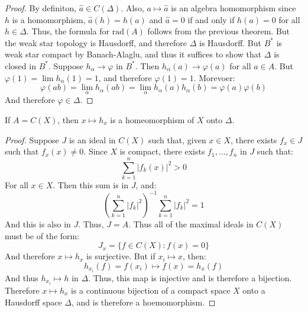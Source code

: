         \begin{proof}
            By definiton, $\hat{a}\in{C}(\Delta)$. Also,
            $a\mapsto\hat{a}$ is an algebra homomorphism since
            $h$ is a homomorphism, $\hat{a}(h)=h(a)$ and
            $\hat{a}=0$ if and only if $h(a)=0$ for all
            $h\in\Delta$. Thus, the formula for $\mathrm{rad}(A)$
            follows from the previous theorem. But the weak star
            topology is Hausdorff, and therefore $\Delta$ is
            Hausdorff. But $B^{*}$ is weak star compact by
            Banach-Alaglu, and thus it suffices to show that
            $\Delta$ is closed in $B^{*}$. Suppose
            $h_{\alpha}\rightarrow\varphi$ in $B^{*}$.
            Then $h_{\alpha}(a)\rightarrow\varphi(a)$ for all
            $a\in{A}$. But $\varphi(1)=\lim{h_{\alpha}}(1)=1$,
            and therefore $\varphi(1)=1$. Morevoer:
            \begin{equation}
                \varphi(ab)
                =\underset{\alpha}{\lim}h_{\alpha}(ab)
                =\underset{\alpha}{\lim}h_{\alpha}(a)
                    h_{\alpha}(b)
                =\varphi(a)\varphi(b)
            \end{equation}
            And therefore $\varphi\in\Delta$.
        \end{proof}
    \begin{theorem}
        If $A=C(X)$, then $x\mapsto{h}_{x}$ is a
        homeomorphism of $X$ onto $\Delta$.
    \end{theorem}
    \begin{proof}
        Suppose $J$ is an ideal in $C(X)$ such that, given
        $x\in{X}$, there exists $f_{x}\in{J}$ such that
        $f_{x}(x)\ne{0}$. Since $X$ is compact, there exists
        $f_{1},\dots,f_{n}$ in $J$ such that:
        \begin{equation}
            \sum_{k=1}^{n}|f_{k}(x)|^{2}>0
        \end{equation}
        For all $x\in{X}$. Then this sum is in $J$, and:
        \begin{equation}
            (\sum_{k=1}^{n}|f_{k}|^{2})^{\minus{1}}
            \sum_{k=1}^{n}|f_{k}|^{2}=1
        \end{equation}
        And this is also in $J$. Thus, $J=A$. Thus all of the
        maximal ideals in $C(X)$ must be of the form:
        \begin{equation}
            J_{x}=\{f\in{C}(X):f(x)=0\}
        \end{equation}
        And therefore $x\mapsto{h}_{x}$ is surjective. But if
        $x_{i}\mapsto{x}$, then:
        \begin{equation}
            h_{x_{i}}(f)=f(x_{i})\mapsto{f}(x)=h_{x}(f)
        \end{equation}
        And thus $h_{x_{i}}\mapsto{h}$ in $\Delta$. Thus, this
        map is injective and is therefore a bijection. Therefore
        $x\mapsto{h}_{x}$ is a continuous bijection of a compact
        space $X$ onto a Hausdorff space $\Delta$, and is
        therefore a hoemomorphism.
    \end{proof}
